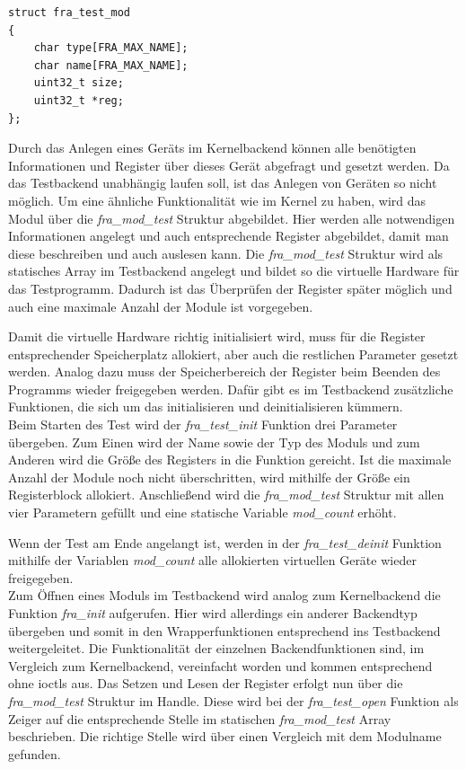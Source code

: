 \begin{lstfloat}
\begin{lstlisting}
struct fra_test_mod
{
	char type[FRA_MAX_NAME];
	char name[FRA_MAX_NAME];
	uint32_t size;
	uint32_t *reg;
};
\end{lstlisting}
\end{lstfloat}

Durch das Anlegen eines Geräts im Kernelbackend können alle benötigten Informationen und Register über dieses Gerät abgefragt und gesetzt werden. Da das Testbackend unabhängig laufen soll, ist das Anlegen von Geräten so nicht möglich. Um eine ähnliche Funktionalität wie im Kernel zu haben, wird das Modul über die \textit{fra\_mod\_test} Struktur abgebildet. Hier werden alle notwendigen Informationen angelegt und auch entsprechende Register abgebildet, damit man diese beschreiben und auch auslesen kann.
Die \textit{fra\_mod\_test} Struktur wird als statisches Array im Testbackend angelegt und bildet so die virtuelle Hardware für das Testprogramm. Dadurch ist das Überprüfen der Register später möglich und auch eine maximale Anzahl der Module ist vorgegeben. 


Damit die virtuelle Hardware richtig initialisiert wird, muss für die Register entsprechender Speicherplatz allokiert, aber auch die restlichen Parameter gesetzt werden. Analog dazu muss der Speicherbereich der Register beim Beenden des Programms wieder freigegeben werden. Dafür gibt es im Testbackend zusätzliche Funktionen, die sich um das initialisieren und deinitialisieren kümmern.\\

 
Beim Starten des Test wird der \textit{fra\_test\_init} Funktion drei Parameter übergeben. Zum Einen wird der Name sowie der Typ des Moduls und zum Anderen wird die Größe des Registers in die Funktion gereicht. Ist die maximale Anzahl der Module noch nicht überschritten, wird mithilfe der Größe ein Registerblock allokiert. Anschließend wird die \textit{fra\_mod\_test} Struktur mit allen vier Parametern gefüllt und eine statische Variable \textit{mod\_count} erhöht.

Wenn der Test am Ende angelangt ist, werden in der \textit{fra\_test\_deinit} Funktion mithilfe der Variablen \textit{mod\_count} alle allokierten virtuellen Geräte wieder freigegeben.\\


Zum Öffnen eines Moduls im Testbackend wird analog zum Kernelbackend die Funktion \textit{fra\_init} aufgerufen. Hier wird allerdings ein anderer Backendtyp übergeben und somit in den Wrapperfunktionen entsprechend ins Testbackend weitergeleitet. 
Die Funktionalität der einzelnen Backendfunktionen sind, im Vergleich zum Kernelbackend, vereinfacht worden und kommen entsprechend ohne \ac{ioctl}s aus. Das Setzen und Lesen der Register erfolgt nun über die \textit{fra\_mod\_test} Struktur im Handle. Diese wird bei der \textit{fra\_test\_open} Funktion als Zeiger auf die entsprechende Stelle im statischen \textit{fra\_mod\_test} Array beschrieben. Die richtige Stelle wird über einen Vergleich mit dem Modulname gefunden.\\



